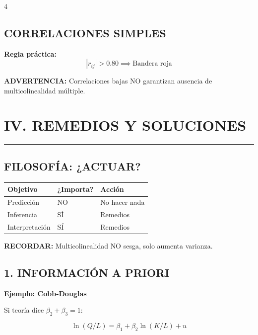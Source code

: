 \documentclass[6pt, landscape]{extarticle}
\newcommand{\sectionline}{%
  \nopagebreak\vspace{-4pt}\noindent\textcolor{GoldLeaf}{\rule{\linewidth}{1pt}}\par\vspace{2pt}%
}
\begin{document}
\begin{multicols*}{4}
\subsection{CORRELACIONES SIMPLES}

\textbf{Regla práctica:}
$$|r_{ij}| > 0.80 \implies \text{Bandera roja}$$

\begin{warningbox}
\textbf{ADVERTENCIA:} Correlaciones bajas NO garantizan ausencia de multicolinealidad múltiple.
\end{warningbox}

\section{IV. REMEDIOS Y SOLUCIONES}
\sectionline

\subsection{FILOSOFÍA: ¿ACTUAR?}

\begin{center}
{\scriptsize
\begin{tabular}{@{}lll@{}}
\toprule
\textbf{Objetivo} & \textbf{¿Importa?} & \textbf{Acción} \\
\midrule
Predicción & NO & No hacer nada \\
Inferencia & SÍ & Remedios \\
Interpretación & SÍ & Remedios \\
\bottomrule
\end{tabular}
}
\end{center}

\begin{warningbox}
\textbf{RECORDAR:} Multicolinealidad NO sesga, solo aumenta varianza.
\end{warningbox}

\subsection{1. INFORMACIÓN A PRIORI}

\textbf{Ejemplo: Cobb-Douglas}

Si teoría dice $\beta_2 + \beta_3 = 1$:
\begin{formulabox}
\vspace{-3pt}
$$\ln(Q/L) = \beta_1 + \beta_2 \ln(K/L) + u$$
\vspace{-3pt}
\end{formulabox}


\end{multicols*}
\end{document}
